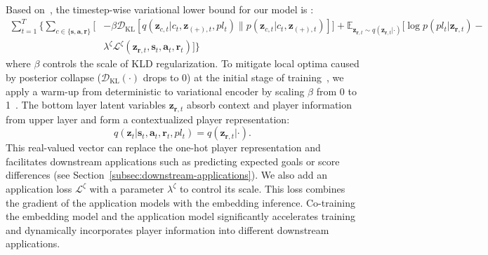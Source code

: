 \documentclass{article}
\newcommand{\context}{c}
\newcommand{\expect}{\mathbb{E}}
\newcommand{\latentvariables}{\mathbf{z}}
\newcommand{\state}{\mathbf{s}}
\newcommand{\action}{\mathbf{a}}
\newcommand{\reward}{\boldsymbol{r}}
\newcommand{\player}{pl}
\begin{document}
Based on~\cite{ChungKDGCB15}, the timestep-wise variational lower bound for our model is :
\begin{align} \label{eq:elbo}
    \sum_{t=1}^{T}\Big\{\sum_{\context\in\{\state,\action,\reward\}}\Big[&-\beta\mathcal{D}_{\text{KL}}[q(\latentvariables_{\context,t}|\context_{t},\latentvariables_{(+),t},\player_{t})\| p(\latentvariables_{\context,t}|\context_{t},\latentvariables_{(+),t})]\Big]+
    \expect_{\latentvariables_{\reward,t} \sim q(\latentvariables_{\reward,t}|\cdot)} \Big[
    \log p(\player_{t}|\latentvariables_{\reward,t})-\nonumber\\[-10pt]
    &\lambda^{\zeta} \mathcal{L}^{\zeta}( \latentvariables_{\reward,t},\state_{t},\action_{t},\reward_{t})\Big]\Big\}
\end{align}
where $\beta$ controls the scale of KLD regularization. To mitigate local optima caused by posterior collapse ($\mathcal{D}_\text{KL}(\cdot)$ drops to $0$) at the initial stage of training~\cite{HePosteriorCollapse19}, we apply a warm-up from deterministic to variational encoder by scaling $\beta$ from 0 to 1~\cite{SonderbyLadderVAE16}.
The bottom layer latent variables $\latentvariables_{\reward,t}$ absorb context and player information from upper layer and form a contextualized player representation: 
$$q(\latentvariables_{t}|
\state_{t},\action_{t},\reward_{t},\player_{t})=q(\latentvariables_{\reward,t}|\cdot).$$ 
This real-valued vector can replace the one-hot player representation and facilitates downstream applications such as predicting expected goals or score differences (see Section~\ref{subsec:downstream-applications}).
We also add an application loss $\mathcal{L}^{\zeta}$ with a parameter $\lambda^{\zeta}$ to control its scale. This loss combines the gradient of the application models with the embedding inference. Co-training the embedding model and the application model significantly accelerates training and  dynamically incorporates player information into different downstream applications. 
\end{document}
